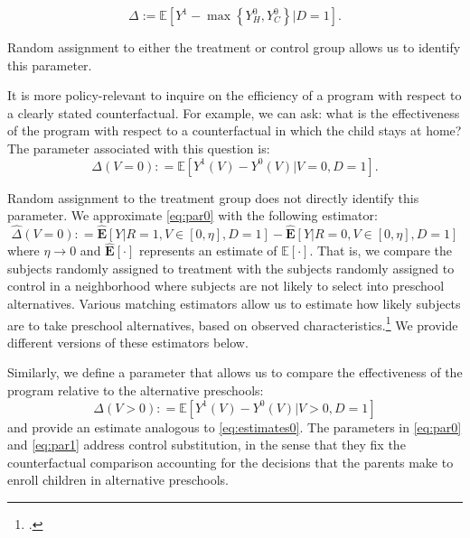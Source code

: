\begin{equation}
\Delta := \mathbb{E} \left[ Y^1 -  \max \left\{ Y_{H}^0,  Y_{C}^0 \right\} | D =1 \right]. \label{eq:mainest}
\end{equation}

\noindent Random assignment to either the treatment or control group allows us to identify this parameter.

It is more policy-relevant to inquire on the efficiency of a program with respect to a clearly stated counterfactual. For example, we can ask: what is the effectiveness of the program with respect to a counterfactual in which the child stays at home? The parameter associated with this question is:
\begin{equation}
\Delta \left(V = 0 \right) : =   \mathbb{E} \left[ Y^1 \left( V \right) - Y^0 \left( V \right) | V = 0, D = 1 \right]. \label{eq:par0}
\end{equation}

\noindent Random assignment to the treatment group does not directly identify this parameter. We approximate \eqref{eq:par0} with the following estimator: 
\begin{equation}
\widehat{\Delta} \left(V = 0 \right) : = \widehat{\mathbf{E}} \left[ Y | R = 1, V \in \left[ 0 , \eta \right], D = 1 \right] - \widehat{\mathbf{E}} \left[ Y | R = 0, V \in \left[ 0 , \eta \right], D = 1 \right] \label{eq:estimates0}
\end{equation}
where $\eta \rightarrow 0$ and $\widehat{\mathbf{E}}[\cdot]$ represents an estimate of $\mathbb{E}[\cdot]$. That is, we compare the subjects randomly assigned to treatment with the subjects randomly assigned to control in a neighborhood where subjects are not likely to select into preschool alternatives. Various matching estimators allow us to estimate how likely subjects are to take preschool alternatives, based on observed characteristics.\footnote{\citet{Heckman_Ichimura_etal_1997_REStud,Heckman_Ichimura_etal_1998_REStud}.} We provide different versions of these estimators below.

Similarly, we define a parameter that allows us to compare the effectiveness of the program relative to the alternative preschools:
\begin{equation}
\Delta \left( V > 0 \right) : =   \mathbb{E} \left[ Y^1 \left(V \right) - Y^0 \left( V \right) | V > 0, D = 1 \right] \label{eq:par1}
\end{equation}
and provide an estimate analogous to \eqref{eq:estimates0}. The parameters in \eqref{eq:par0} and \eqref{eq:par1} address control substitution, in the sense that they fix the counterfactual comparison accounting for the decisions that the parents make to enroll children in alternative preschools.

